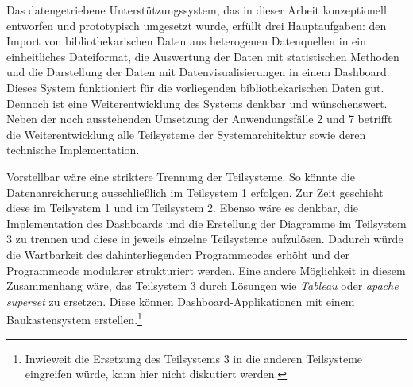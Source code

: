 

Das datengetriebene Unterstützungssystem, das in dieser Arbeit konzeptionell entworfen und prototypisch umgesetzt wurde, erfüllt drei Hauptaufgaben:
den Import von bibliothekarischen Daten aus heterogenen Datenquellen in ein einheitliches Dateiformat, die Auswertung der Daten mit statistischen Methoden und 
die Darstellung der Daten mit Datenvisualisierungen in einem Dashboard.
Dieses System funktioniert für die vorliegenden bibliothekarischen Daten gut.
Dennoch ist eine Weiterentwicklung des Systems denkbar und wünschenswert. 
Neben der noch ausstehenden Umsetzung der Anwendungsfälle 2 und 7 betrifft die Weiterentwicklung alle Teilsysteme der Systemarchitektur
sowie deren technische Implementation.

Vorstellbar wäre eine striktere Trennung der Teilsysteme. 
So könnte die Datenanreicherung ausschließlich im Teilsystem 1 erfolgen. Zur Zeit geschieht diese im Teilsystem 1 und im Teilsystem 2. 
Ebenso wäre es denkbar, die Implementation des Dashboards und die Erstellung der Diagramme im Teilsystem 3 zu trennen und diese in jeweils einzelne Teilsysteme
aufzulösen. Dadurch würde die Wartbarkeit des dahinterliegenden Programmcodes erhöht und der Programmcode modularer strukturiert werden.
Eine andere Möglichkeit in diesem Zusammenhang wäre, das Teilsystem 3 durch Lösungen wie \textit{Tableau} oder \textit{apache superset} zu ersetzen.
Diese können Dashboard-Applikationen mit einem Baukastensystem erstellen.\footnote{Inwieweit die Ersetzung des Teilsystems 3 in die anderen Teilsysteme eingreifen würde, kann
hier nicht diskutiert werden.}

